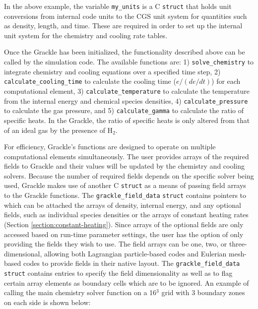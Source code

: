 In the above example, the variable \texttt{my\_units} is a C
\texttt{struct} that holds unit conversions from internal code units
to the CGS unit system for quantities such as density, length, and
time.  These are required in order to set up the internal unit system
for the chemistry and cooling rate tables.

Once the Grackle has been initialized, the functionality described
above can be called by the simulation code.  The available functions
are: 1) \texttt{solve\_chemistry} to integrate chemistry and cooling
equations over a specified time step, 2)
\texttt{calculate\_cooling\_time} to calculate the cooling time
($e/(de/dt)$) for each computational element, 3)
\texttt{calculate\_temperature} to calculate the temperature from the
internal energy and chemical species densities, 4)
\texttt{calculate\_pressure} to calculate the gas pressure, and 5)
\texttt{calculate\_gamma} to calculate the ratio of specific heats.
In the Grackle, the ratio of specific heats is only altered from that
of an ideal gas by the presence of H$_{2}$.

For efficiency, Grackle's functions are designed to operate on
multiple computational elements simultaneously.  The user provides
arrays of the required fields to Grackle and their values will be
updated by the chemistry and cooling solvers.  Because the number of
required fields depends on the specific solver being used, Grackle
makes use of another C \texttt{struct} as a means of passing field
arrays to the Grackle functions.  The \texttt{grackle\_field\_data}
\texttt{struct} contains pointers to which can be attached the arrays
of density, internal energy, and any optional fields, such as
individual species densities or the arrays of constant heating rates
(Section \ref{section:constant-heating}).  Since arrays of the
optional fields are only accessed based on run-time parameter
settings, the user has the option of only providing the fields they
wish to use.  The field arrays can be one, two, or three-dimensional,
allowing both Lagrangian particle-based codes and Eulerian mesh-based
codes to provide fields in their native layout.  The
\texttt{grackle\_field\_data} \texttt{struct} contains entries to
specify the field dimensionality as well as to flag certain array
elements as boundary cells which are to be ignored.  An example of
calling the main chemistry solver function on a 16$^{3}$ grid with 3
boundary zones on each side is shown below:

